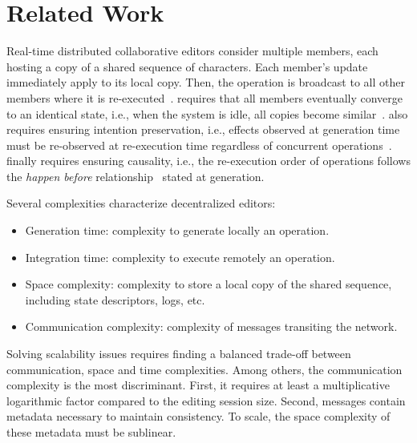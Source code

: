 \section{Related Work}
\label{sec:relatedwork}

Real-time distributed collaborative editors consider multiple members, each
hosting a copy of a shared sequence of characters. Each member's update
immediately apply to its local copy. Then, the operation is broadcast to all
other members where it is
re-executed~\cite{saito2005optimistic}.  requires that all
members eventually converge to an identical state, i.e., when the system is
idle, all copies become similar~\cite{bailis2013eventual}. 
also requires ensuring intention preservation, i.e., effects observed at
generation time must be re-observed at re-execution time regardless of
concurrent operations~\cite{sun1998achieving}.  finally
requires ensuring causality, i.e., the re-execution order of operations follows
the \emph{happen before} relationship~\cite{lamport1978time} stated at
generation.

Several complexities characterize decentralized editors:
\begin{itemize}
\item Generation time: complexity to generate locally an operation.
\item Integration time: complexity to execute remotely an operation.
\item Space complexity: complexity to store a local copy of the shared sequence,
  including state descriptors, logs, etc.
\item Communication complexity: complexity of messages transiting the network.
\end{itemize}
Solving scalability issues requires finding a balanced trade-off between
communication, space and time complexities.  Among others, the communication
complexity is the most discriminant. First, it requires at least a
multiplicative logarithmic factor compared to the editing session size. Second,
messages contain metadata necessary to maintain consistency. To scale, the space
complexity of these metadata must be sublinear.

